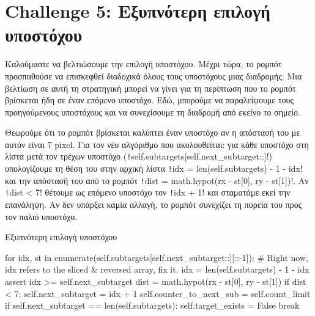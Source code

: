 \section{Challenge 5: Εξυπνότερη επιλογή υποστόχου}
Καλούμαστε να βελτιώσουμε την επιλογή υποστόχου.
Μέχρι τώρα, το ρομπότ προσπαθούσε να επισκεφθεί διαδοχικά όλους τους υποστόχους μιας διαδρομής.
Μια βελτίωση σε αυτή τη στρατηγική μπορεί να γίνει για τη περίπτωση που το ρομπότ βρίσκεται ήδη σε έναν επόμενο υποστόχο.
Εδώ, μπορούμε να παραλείψουμε τους προηγούμενους υποστόχους και να συνεχίσουμε τη διαδρομή από εκείνο το σημείο.

\sloppy Θεωρούμε ότι το ρομπότ βρίσκεται καλύπτει έναν υποστόχο αν η απόστασή του με αυτόν είναι 7 pixel.
Για τον νέο αλγόριθμο που ακολουθείται: για κάθε υποστόχο στη λίστα μετά τον τρέχων υποστόχο
(\texttt!self.subtargets[self.next_subtarget::]!)
υπολογίζουμε τη θέση του στην αρχική λίστα
\texttt!idx = len(self.subtargets) - 1 - idx!
και την απόστασή του από το ρομπότ
\texttt!dist = math.hypot(rx - st[0], ry - st[1])!.
Αν \texttt!dist < 7! θέτουμε ως επόμενο υποστόχο τον \texttt!idx + 1! και σταματάμε εκεί την επανάληψη.
Αν δεν υπάρξει καμία αλλαγή, το ρομπότ συνεχίζει τη πορεία του προς τον παλιό υποστόχο.

\begin{code}
\caption{Εξυπνότερη επιλογή υποστόχου}
\begin{pythoncode}
for idx, st in enumerate(self.subtargets[self.next_subtarget::][::-1]):
    # Right now, idx refers to the sliced & reversed array, fix it.
    idx = len(self.subtargets) - 1 - idx
    assert idx >= self.next_subtarget
    dist = math.hypot(rx - st[0], ry - st[1])
    if dist < 7:
        self.next_subtarget = idx + 1
        self.counter_to_next_sub = self.count_limit
        if self.next_subtarget == len(self.subtargets):
            self.target_exists = False
        break
\end{pythoncode}
\end{code}
